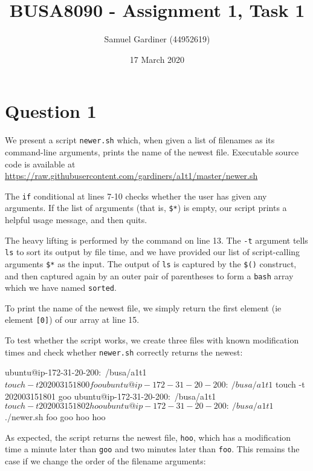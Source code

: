 \documentclass{article}
\title{BUSA8090 - Assignment 1, Task 1}
\author{Samuel Gardiner (44952619)}
\date{17 March 2020}
\begin{document}
\maketitle

\section{Question 1}

We present a script \texttt{newer.sh} which, when given a list of filenames as its command-line arguments, prints the name of the newest file. Executable source code is available at \url{https://raw.githubusercontent.com/gardiners/a1t1/master/newer.sh}


The \texttt{if} conditional at lines 7-10 checks whether the user has given any arguments. If the list of arguments (that is, \texttt{\$*}) is empty, our script prints a helpful usage message, and then quits.

The heavy lifting is performed by the command  on line 13. The \texttt{-t} argument tells \texttt{ls} to sort its output by file time, and we have provided our list of script-calling arguments \texttt{\$*} as the input. The output of \texttt{ls} is captured by the \texttt{\$()} construct, and then captured again by an outer pair of parentheses to form a \texttt{bash} array which we have named \texttt{sorted}.

To print the name of the newest file, we simply return the first element (ie element \texttt{[0]}) of our array at line 15. 

To test whether the script works, we create three files with known modification times and check whether \texttt{newer.sh} correctly returns the newest:

\begin{bashinline}
ubuntu@ip-172-31-20-200:~/busa/a1t1$ touch -t 202003151800 foo
ubuntu@ip-172-31-20-200:~/busa/a1t1$ touch -t 202003151801 goo
ubuntu@ip-172-31-20-200:~/busa/a1t1$ touch -t 202003151802 hoo
ubuntu@ip-172-31-20-200:~/busa/a1t1$ ./newer.sh foo goo hoo
hoo
\end{bashinline}

As expected, the script returns the newest file, \texttt{hoo}, which has a modification time a minute later than \texttt{goo} and two minutes later than \texttt{foo}. This remains the case if we change the order of the filename arguments:

\end{document}
